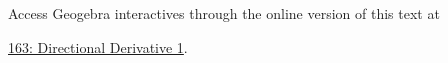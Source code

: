 \documentclass{ximera}
\begin{document}
\begin{question}
\begin{enumerate}
 
\begin{onlineOnly}
    \begin{center}
\end{center}
\end{onlineOnly}

Access Geogebra interactives through the online version of this text at
 
\href{https://www.geogebra.org/classic/cfkfwfpk}{163: Directional Derivative 1}.

\end{enumerate}

\end{question}
\end{document}
